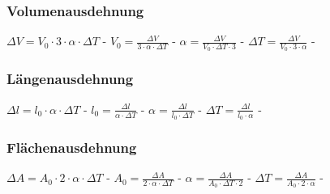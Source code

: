 \subsubsection{Volumenausdehnung} 
\begin{minipage}{0.45\textwidth} 
\end{minipage} 
\begin{minipage}{0.45\textwidth} 
 
\legende{}\end{minipage} 
 
$ \Delta V = V_{0} \cdot 3\cdot \alpha \cdot \Delta T $ - $ V_{0}  = \frac{  \Delta V}{3\cdot \alpha \cdot \Delta T} $ - $ \alpha  = \frac{  \Delta V}{V_{0} \cdot \Delta T\cdot 3} $ - $ \Delta T = \frac{  \Delta V}{V_{0} \cdot 3\cdot \alpha } $ - \\ 
 
\subsubsection{Längenausdehnung} 
\begin{minipage}{0.45\textwidth} 
\end{minipage} 
\begin{minipage}{0.45\textwidth} 
 
\legende{}\end{minipage} 
 
$ \Delta l = l_{0} \cdot \alpha \cdot \Delta T $ - $ l_{0}  = \frac{ \Delta l}{\alpha \cdot \Delta T} $ - $ \alpha  = \frac{ \Delta l}{l_{0} \cdot \Delta T} $ - $ \Delta T = \frac{ \Delta l}{l_{0} \cdot \alpha } $ - \\ 
 
\subsubsection{Flächenausdehnung} 
\begin{minipage}{0.45\textwidth} 
\end{minipage} 
\begin{minipage}{0.45\textwidth} 
 
\legende{}\end{minipage} 
 
$ \Delta A = A_{0} \cdot 2\cdot \alpha \cdot \Delta T $ - $ A_{0}  = \frac{ \Delta A}{2\cdot \alpha \cdot \Delta T} $ - $ \alpha  = \frac{ \Delta A}{A_{0} \cdot \Delta T\cdot 2} $ - $ \Delta T = \frac{ \Delta A}{A_{0} \cdot 2\cdot \alpha } $ - \\ 
 
